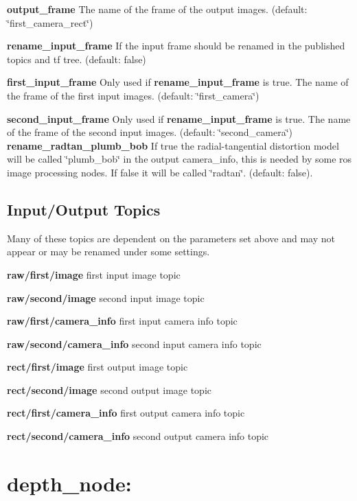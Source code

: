 \begin{DoxyItemize}
\item {\bfseries output\+\_\+frame} The name of the frame of the output images. (default\+: \char`\"{}first\+\_\+camera\+\_\+rect\char`\"{})
\item {\bfseries rename\+\_\+input\+\_\+frame} If the input frame should be renamed in the published topics and tf tree. (default\+: false)
\item {\bfseries first\+\_\+input\+\_\+frame} Only used if {\bfseries rename\+\_\+input\+\_\+frame} is true. The name of the frame of the first input images. (default\+: \char`\"{}first\+\_\+camera\char`\"{})
\item {\bfseries second\+\_\+input\+\_\+frame} Only used if {\bfseries rename\+\_\+input\+\_\+frame} is true. The name of the frame of the second input images. (default\+: \char`\"{}second\+\_\+camera\char`\"{}) {\bfseries rename\+\_\+radtan\+\_\+plumb\+\_\+bob} If true the radial-\/tangential distortion model will be called \char`\"{}plumb\+\_\+bob\char`\"{} in the output camera\+\_\+info, this is needed by some ros image processing nodes. If false it will be called \char`\"{}radtan\char`\"{}. (default\+: false).
\end{DoxyItemize}\hypertarget{md_vision_layer_image_undistort_README_autotoc_md105}{}\subsection{Input/\+Output Topics}\label{md_vision_layer_image_undistort_README_autotoc_md105}
Many of these topics are dependent on the parameters set above and may not appear or may be renamed under some settings.
\begin{DoxyItemize}
\item {\bfseries raw/first/image} first input image topic
\item {\bfseries raw/second/image} second input image topic
\item {\bfseries raw/first/camera\+\_\+info} first input camera info topic
\item {\bfseries raw/second/camera\+\_\+info} second input camera info topic
\item {\bfseries rect/first/image} first output image topic
\item {\bfseries rect/second/image} second output image topic
\item {\bfseries rect/first/camera\+\_\+info} first output camera info topic
\item {\bfseries rect/second/camera\+\_\+info} second output camera info topic
\end{DoxyItemize}\hypertarget{md_vision_layer_image_undistort_README_autotoc_md106}{}\section{depth\+\_\+node\+:}\label{md_vision_layer_image_undistort_README_autotoc_md106}
